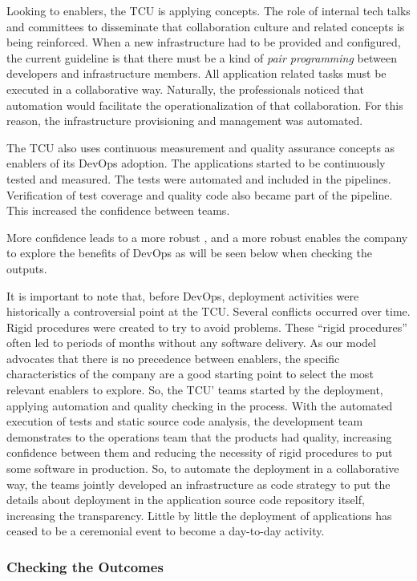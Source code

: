 Looking to enablers, the TCU is applying  concepts.
The role of internal tech talks and committees to disseminate that collaboration
culture and related concepts is being reinforced. When a new infrastructure had
to be provided and configured, the current guideline is that there must be a
kind of \emph{pair programming} between developers and infrastructure
members. All application related tasks must be executed in a collaborative
way. Naturally, the professionals noticed that automation would facilitate the
operationalization of that collaboration. For this reason, the infrastructure
provisioning and management was automated.

The TCU also uses continuous measurement and quality assurance concepts as
enablers of its DevOps adoption. The applications started to be continuously
tested and measured. The tests were automated and included in the pipelines.
Verification of test coverage and quality code also became part of the pipeline.
This increased the confidence between teams. {\color{blue} More confidence leads to a more
robust \cc, and a more robust \cc enables the company to explore the benefits
of DevOps as will be seen below when checking the outputs.

It is important to note that, before DevOps, deployment activities were
historically a controversial point at the TCU. Several conflicts occurred over
time. Rigid procedures were created to try to avoid problems. These ``rigid
procedures'' often led to periods of months without any software delivery. As
our model advocates that there is no precedence between enablers, the specific
characteristics of the company are a good starting point to select the most
relevant enablers to explore. So, the TCU' teams started by the deployment,
applying automation and quality checking in the process. With the automated
execution of tests and static source code analysis, the development team
demonstrates to the operations team that the products had quality, increasing
confidence between them and reducing the necessity of rigid procedures to put
some software in production. So, to automate the deployment in a collaborative
way, the teams jointly developed an infrastructure as code strategy to put the
details about deployment in the application source code repository itself,
increasing the transparency. Little by little the deployment of applications has
ceased to be a ceremonial event to become a day-to-day activity.
}

\subsubsection{Checking the Outcomes}

